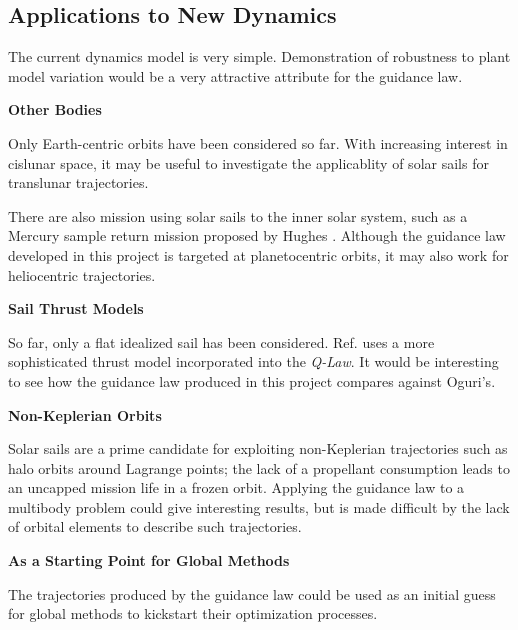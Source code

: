 \subsection{Applications to New Dynamics}
The current dynamics model is very simple. Demonstration of robustness to plant model variation would be a very attractive attribute for the guidance law.

\textbf{Other Bodies}

Only Earth-centric orbits have been considered so far. With increasing interest in cislunar space, it may be useful to investigate the applicablity of solar sails for translunar trajectories.

There are also mission using solar sails to the inner solar system, such as a Mercury sample return mission proposed by Hughes \cite{hughes2006sample}. Although the guidance law developed in this project is targeted at planetocentric orbits, it may also work for heliocentric trajectories.

\textbf{Sail Thrust Models}

So far, only a flat idealized sail has been considered. Ref. \cite{oguri2023solar} uses a more sophisticated thrust model incorporated into the \textit{Q-Law}. It would be interesting to see how the guidance law produced in this project compares against Oguri's.

\textbf{Non-Keplerian Orbits}

Solar sails are a prime candidate for exploiting non-Keplerian trajectories such as halo orbits around Lagrange points; the lack of a propellant consumption leads to an uncapped mission life in a frozen orbit. Applying the guidance law to a multibody problem could give interesting results, but is made difficult by the lack of orbital elements to describe such trajectories.

\textbf{As a Starting Point for Global Methods}

The trajectories produced by the guidance law could be used as an initial guess for global methods to kickstart their optimization processes.